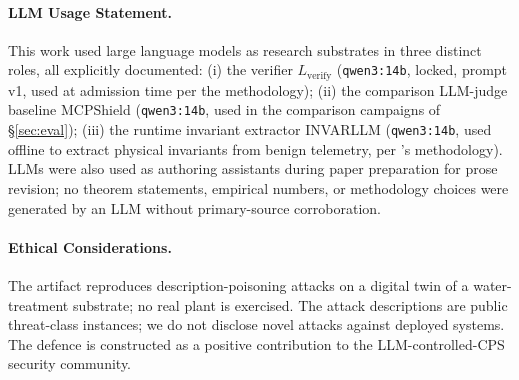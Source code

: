 \paragraph{LLM Usage Statement.}
This work used large language models as research substrates in three
distinct roles, all explicitly documented: (i) the verifier
$L_{\text{verify}}$ (\texttt{qwen3:14b}, locked, prompt v1, used at
admission time per the methodology); (ii) the comparison LLM-judge
baseline MCPShield (\texttt{qwen3:14b}, used in the comparison
campaigns of \S\ref{sec:eval}); (iii) the runtime invariant extractor
INVARLLM (\texttt{qwen3:14b}, used offline to extract physical
invariants from benign telemetry, per
\cite{invarllm}'s methodology). LLMs were also
used as authoring assistants during paper preparation for prose
revision; no theorem statements, empirical numbers, or methodology
choices were generated by an LLM without primary-source corroboration.

\paragraph{Ethical Considerations.}
The artifact reproduces description-poisoning attacks on a digital
twin of a water-treatment substrate; no real plant is exercised. The
attack descriptions are public threat-class instances; we do not
disclose novel attacks against deployed systems. The defence is
constructed as a positive contribution to the LLM-controlled-CPS
security community.

